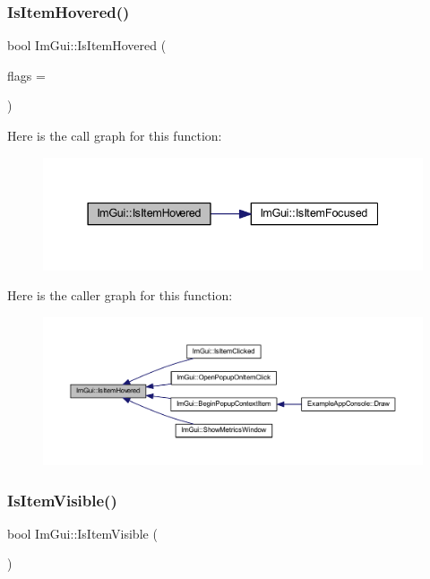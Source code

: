\subsubsection{\texorpdfstring{Is\+Item\+Hovered()}{IsItemHovered()}}
{\footnotesize\ttfamily bool Im\+Gui\+::\+Is\+Item\+Hovered (\begin{DoxyParamCaption}\item[{\mbox{\hyperlink{imgui_8h_a3a8f688665e5ea0bd9700e1251580a2c}{Im\+Gui\+Hovered\+Flags}}}]{flags = {} }\end{DoxyParamCaption})}

Here is the call graph for this function\+:
\nopagebreak
\begin{figure}[H]
\begin{center}
\leavevmode
\includegraphics[width=337pt]{namespace_im_gui_ac9a400eff3a9561d95e80486c52a660b_cgraph}
\end{center}
\end{figure}
Here is the caller graph for this function\+:
\nopagebreak
\begin{figure}[H]
\begin{center}
\leavevmode
\includegraphics[width=350pt]{namespace_im_gui_ac9a400eff3a9561d95e80486c52a660b_icgraph}
\end{center}
\end{figure}
\mbox{\label{namespace_im_gui_a0e9273fc53bdf7ca39d59cdb657c3c2f}} 
\subsubsection{\texorpdfstring{Is\+Item\+Visible()}{IsItemVisible()}}
{\footnotesize\ttfamily bool Im\+Gui\+::\+Is\+Item\+Visible (\begin{DoxyParamCaption}{ }\end{DoxyParamCaption})}

